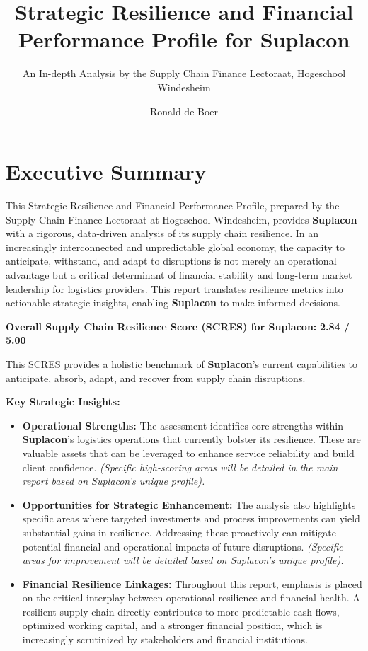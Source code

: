 \documentclass[
  oneside,
  open=any,
  fontsize=11pt]{scrbook}
\title{Strategic Resilience and Financial Performance Profile for
Suplacon}
\subtitle{An In-depth Analysis by the Supply Chain Finance Lectoraat,
Hogeschool Windesheim}
\author{Ronald de Boer}
\date{}
\providecommand{\tightlist}{%
  \setlength{\itemsep}{0pt}\setlength{\parskip}{0pt}}
\renewcommand*\contentsname{Table of contents}
\newcommand\contentsname{Table of contents}
\begin{document}
\frontmatter
\maketitle

\renewcommand*\contentsname{Table of contents}
{
\setcounter{tocdepth}{2}
\tableofcontents
}
\listoffigures
\listoftables

\mainmatter
\newpage

\chapter{Executive Summary}\label{executive-summary}

This Strategic Resilience and Financial Performance Profile, prepared by
the Supply Chain Finance Lectoraat at Hogeschool Windesheim, provides
\textbf{Suplacon} with a rigorous, data-driven analysis of its supply
chain resilience. In an increasingly interconnected and unpredictable
global economy, the capacity to anticipate, withstand, and adapt to
disruptions is not merely an operational advantage but a critical
determinant of financial stability and long-term market leadership for
logistics providers. This report translates resilience metrics into
actionable strategic insights, enabling \textbf{Suplacon} to make
informed decisions.

\textbf{Overall Supply Chain Resilience Score (SCRES) for Suplacon:}
\textbf{2.84 / 5.00}

This SCRES provides a holistic benchmark of \textbf{Suplacon}'s current
capabilities to anticipate, absorb, adapt, and recover from supply chain
disruptions.

\textbf{Key Strategic Insights:}

\begin{itemize}
\tightlist
\item
  \textbf{Operational Strengths:} The assessment identifies core
  strengths within \textbf{Suplacon}'s logistics operations that
  currently bolster its resilience. These are valuable assets that can
  be leveraged to enhance service reliability and build client
  confidence. \emph{(Specific high-scoring areas will be detailed in the
  main report based on Suplacon's unique profile).}
\item
  \textbf{Opportunities for Strategic Enhancement:} The analysis also
  highlights specific areas where targeted investments and process
  improvements can yield substantial gains in resilience. Addressing
  these proactively can mitigate potential financial and operational
  impacts of future disruptions. \emph{(Specific areas for improvement
  will be detailed based on Suplacon's unique profile).}
\item
  \textbf{Financial Resilience Linkages:} Throughout this report,
  emphasis is placed on the critical interplay between operational
  resilience and financial health. A resilient supply chain directly
  contributes to more predictable cash flows, optimized working capital,
  and a stronger financial position, which is increasingly scrutinized
  by stakeholders and financial institutions.
\end{itemize}
\end{document}

